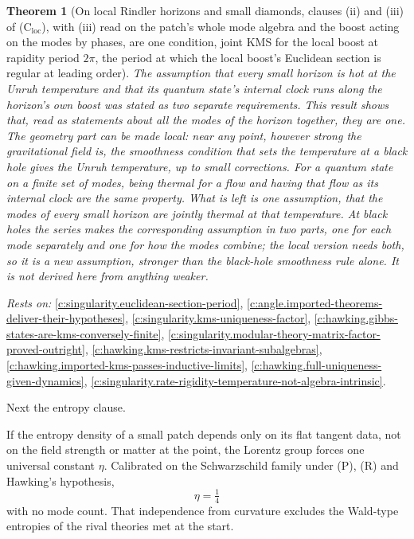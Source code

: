 \documentclass[11pt]{article}
\newtheorem{theorem}{Theorem}[section]
\theoremstyle{definition}
\theoremstyle{plain}
\begin{document}
\begin{theorem}[On local Rindler horizons and small diamonds, clauses (ii) and (iii) of (C$_{\mathrm{loc}}$), with (iii) read on the patch's whole mode algebra and the boost acting on the modes by phases, are one condition, joint KMS for the local boost at rapidity period $2\pi$, the period at which the local boost's Euclidean section is regular at leading order]\label{c:synthesis.local-boost-temperature-is-local-regularity}
The assumption that every small horizon is hot at the Unruh temperature and that its quantum state's internal clock runs along the horizon's own boost was stated as two separate requirements. This result shows that, read as statements about all the modes of the horizon together, they are one. The geometry part can be made local: near any point, however strong the gravitational field is, the smoothness condition that sets the temperature at a black hole gives the Unruh temperature, up to small corrections. For a quantum state on a finite set of modes, being thermal for a flow and having that flow as its internal clock are the same property. What is left is one assumption, that the modes of every small horizon are jointly thermal at that temperature. At black holes the series makes the corresponding assumption in two parts, one for each mode separately and one for how the modes combine; the local version needs both, so it is a new assumption, stronger than the black-hole smoothness rule alone. It is not derived here from anything weaker.
\end{theorem}
\noindent\emph{Rests on:} \ref{c:singularity.euclidean-section-period}, \ref{c:angle.imported-theorems-deliver-their-hypotheses}, \ref{c:singularity.kms-uniqueness-factor}, \ref{c:hawking.gibbs-states-are-kms-conversely-finite}, \ref{c:singularity.modular-theory-matrix-factor-proved-outright}, \ref{c:hawking.kms-restricts-invariant-subalgebras}, \ref{c:hawking.imported-kms-passes-inductive-limits}, \ref{c:hawking.full-uniqueness-given-dynamics}, \ref{c:singularity.rate-rigidity-temperature-not-algebra-intrinsic}.

Next the entropy clause.

If the entropy density of a small patch depends only on its flat tangent data, not on the field strength or matter at the point, the Lorentz group forces one universal constant $\eta$. Calibrated on the Schwarzschild family under (P), (R) and Hawking's hypothesis, \[ \eta = \tfrac14 \] with no mode count. That independence from curvature excludes the Wald-type entropies of the rival theories met at the start.
\end{document}
